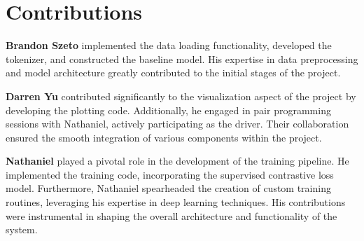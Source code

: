 \section*{Contributions}

\label{sec:contributions}

\noindent\textbf{Brandon Szeto} implemented the data loading functionality, developed the tokenizer, and constructed the baseline model. His expertise in data preprocessing and model architecture greatly contributed to the initial stages of the project.

\noindent\textbf{Darren Yu} contributed significantly to the visualization aspect of the project by developing the plotting code. Additionally, he engaged in pair programming sessions with Nathaniel, actively participating as the driver. Their collaboration ensured the smooth integration of various components within the project.

\noindent\textbf{Nathaniel} played a pivotal role in the development of the training pipeline. He implemented the training code, incorporating the supervised contrastive loss model. Furthermore, Nathaniel spearheaded the creation of custom training routines, leveraging his expertise in deep learning techniques. His contributions were instrumental in shaping the overall architecture and functionality of the system.

